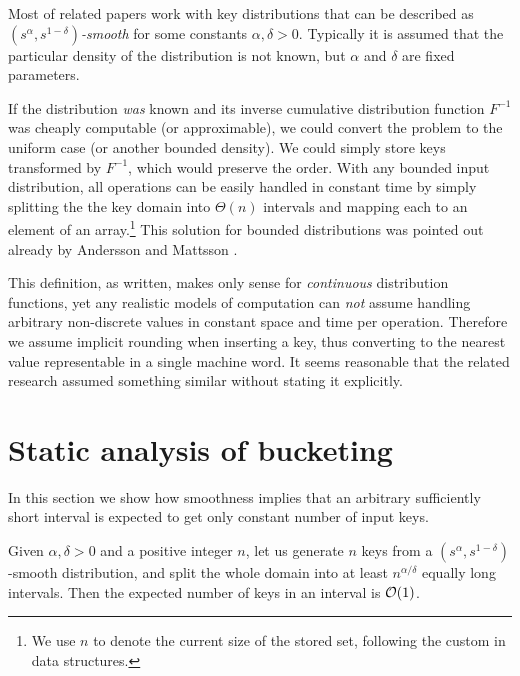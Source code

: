 Most of related papers work with key distributions that can be described
as \emph{$\left(s^{\alpha},s^{1-\delta}\right)$-smooth} for some
constants $\alpha,\delta>0$. Typically it is assumed that the particular
density of the distribution is not known, but $\alpha$ and $\delta$
are fixed parameters.
\begin{rem*}
If the distribution \emph{was} known and its inverse cumulative distribution
function $F^{-1}$ was cheaply computable (or approximable), we could
convert the problem to the uniform case (or another bounded density).
We could simply store keys transformed by $F^{-1}$, which would preserve
the order. With any bounded input distribution, all operations can
be easily handled in constant time by simply splitting the the key
domain into $\Theta(n)$ intervals and mapping each to an element
of an array.\footnote{We use $n$ to denote the current size of the stored set, following
the custom in data structures.} This solution for bounded distributions was pointed out already by
Andersson and Mattsson \cite[sec. 5.2]{AndersM93}.
\end{rem*}

\begin{rem*}
This definition, as written, makes only sense for \emph{continuous}
distribution functions, yet any realistic models of computation can
\emph{not} assume handling arbitrary non-discrete values in constant
space and time per operation. Therefore we assume implicit rounding
when inserting a key, thus converting to the nearest value representable
in a single machine word. It seems reasonable that the related research
assumed something similar without stating it explicitly.
\end{rem*}

\section{Static analysis of bucketing \label{sec:smooth-bucket}}

In this section we show how smoothness implies that an arbitrary sufficiently
short interval is expected to get only constant number of input keys.
\begin{lem*}
\label{lem:smooth-bucket} Given $\alpha,\delta>0$ and a positive
integer $n$, let us generate $n$ keys from a $\left(s^{\alpha},s^{1-\delta}\right)$-smooth
distribution, and split the whole domain into at least $n^{\alpha/\delta}$
equally long intervals. Then the expected number of keys in an interval
is $\mathcal O(1)$.
\end{lem*}


